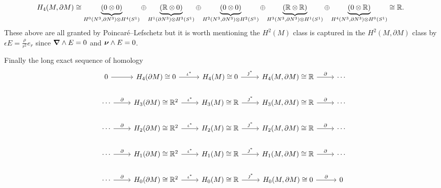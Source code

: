 \documentclass{article}
\begin{document}
\begin{example}
\begin{itemize}
\begin{itemize}
\begin{align*}
    H_4(M,\partial M) &\cong \underbrace{(0 \otimes 0)}_{H^0(N^3,\partial N^3)\otimes H^4(S^1)} \oplus \underbrace{(\mathbb{R} \otimes 0)}_{H^1(\partial N^3)\otimes H^3(S^1)} \oplus \underbrace{(0 \otimes 0)}_{H^2(N^3,\partial N^3)\otimes H^2(S^1)} \oplus \underbrace{(\mathbb{R} \otimes \mathbb{R})}_{H^3(N^3,\partial N^3)\otimes H^1(S^1)} \oplus \underbrace{(0 \otimes \mathbb{R})}_{H^4(N^3,\partial N^3)\otimes H^0(S^1)} \cong \mathbb{R}.
\end{align*}
These above are all granted by Poincar\'e--Lefschetz but it is worth mentioning the $H^2(M)$ class is captured in the $H^2(M,\partial M)$ class by $\epsilon E = \frac{\rho}{r^2} e_r$ since $\boldsymbol{\nabla} \wedge E=0$ and $\boldsymbol{\nu} \wedge E=0$. 

Finally the long exact sequence of homology
\[
\begin{tikzcd}
0 \arrow[r]                          & H_4(\partial M)\cong 0 \arrow[r, "\iota^*"]            & H_4(M)\cong 0 \arrow[r, "\jmath^*"]          & {H_4(M,\partial M)\cong \R} \arrow[r, "\partial"]          & \cdots \\
\cdots \arrow[r, "\partial"]                          & H_3(\partial M)\cong \R^2 \arrow[r, "\iota^*"]            & H_3(M)\cong \R \arrow[r, "\jmath^*"]          & {H_3(M,\partial M)\cong \R} \arrow[r, "\partial"]          & \cdots \\
\cdots \arrow[r, "\partial"] & H_2(\partial M)\cong \mathbb{R}^2 \arrow[r, "\iota^*"]   & H_2(M) \cong \R \arrow[r, "\jmath^*"]         & {H_2(M,\partial M)\cong \R} \arrow[r, "\partial"] & \cdots \\
\cdots \arrow[r, "\partial"] & H_1(\partial M)\cong \mathbb{R}^2 \arrow[r, "\iota^*"] & H_1(M)\cong \mathbb{R} \arrow[r, "\jmath^*"] & {H_1(M,\partial M)\cong\R} \arrow[r, "\partial"]          & \cdots \\
\cdots \arrow[r, "\partial"] & H_0(\partial M)\cong \mathbb{R}^2 \arrow[r, "\iota^*"]   & H_0(M)\cong \mathbb{R} \arrow[r, "\jmath^*"] & {H_0(M,\partial M)\cong 0} \arrow[r, "\partial"]          & 0     
\end{tikzcd}
\]


\end{itemize}
\end{itemize}
\end{example}
\end{document}
